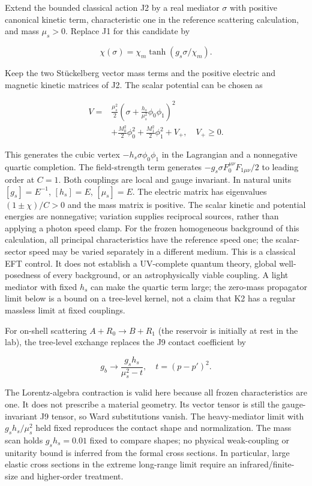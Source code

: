 \documentclass[
  11pt,
  twoside]{article}
\begin{document}
Extend the bounded classical action J2 by a real mediator \(\sigma\)
with positive canonical kinetic term, characteristic one in the
reference scattering calculation, and mass \(\mu_s>0\). Replace J1 for
this candidate by

\[\chi(\sigma)=\chi_m\tanh(g_s\sigma/\chi_m).\tag{K1}\]

Keep the two Stückelberg vector mass terms and the positive electric and
magnetic kinetic matrices of J2. The scalar potential can be chosen as

\[\begin{aligned}
V={}&\frac{\mu_s^2}{2}\left(\sigma+\frac{h_s}{\mu_s^2}\phi_0\phi_1\right)^2\\
&+\frac{M_0^2}{2}\phi_0^2+\frac{M_1^2}{2}\phi_1^2+V_+,\quad V_+\geq0.
\end{aligned}\tag{K2}\]

This generates the cubic vertex \(-h_s\sigma\phi_0\phi_1\) in the
Lagrangian and a nonnegative quartic completion. The field-strength term
generates \(-g_s\sigma F_0^{\mu\nu}F_{1\mu\nu}/2\) to leading order at
\(C=1\). Both couplings are local and gauge invariant. In natural units
\([g_s]=E^{-1}\), \([h_s]=E\), \([\mu_s]=E\). The electric matrix has
eigenvalues \((1\pm\chi)/C>0\) and the mass matrix is positive. The
scalar kinetic and potential energies are nonnegative; variation
supplies reciprocal sources, rather than applying a photon speed clamp.
For the frozen homogeneous background of this calculation, all principal
characteristics have the reference speed one; the scalar-sector speed
may be varied separately in a different medium. This is a classical EFT
control. It does not establish a UV-complete quantum theory, global
well-posedness of every background, or an astrophysically viable
coupling. A light mediator with fixed \(h_s\) can make the quartic term
large; the zero-mass propagator limit below is a bound on a tree-level
kernel, not a claim that K2 has a regular massless limit at fixed
couplings.

For on-shell scattering \(A+R_0\to B+R_1\) (the reservoir is initially
at rest in the lab), the tree-level exchange replaces the J9 contact
coefficient by

\[g_b\longrightarrow \frac{g_s h_s}{\mu_s^2-t},\quad t=(p-p')^2.\tag{K3}\]

The Lorentz-algebra contraction is valid here because all frozen
characteristics are one. It does not prescribe a material geometry. Its
vector tensor is still the gauge-invariant J9 tensor, so Ward
substitutions vanish. The heavy-mediator limit with \(g_s h_s/\mu_s^2\)
held fixed reproduces the contact shape and normalization. The mass scan
holds \(g_s h_s=0.01\) fixed to compare shapes; no physical
weak-coupling or unitarity bound is inferred from the formal cross
sections. In particular, large elastic cross sections in the extreme
long-range limit require an infrared/finite-size and higher-order
treatment.
\end{document}
